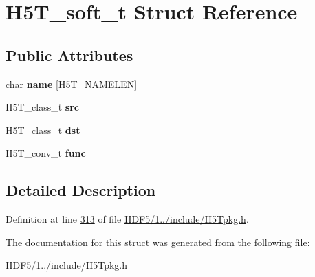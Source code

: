 \hypertarget{struct_h5_t__soft__t}{}\section{H5\+T\+\_\+soft\+\_\+t Struct Reference}
\label{struct_h5_t__soft__t}
\subsection*{Public Attributes}
\begin{DoxyCompactItemize}
\item 
\mbox{\label{struct_h5_t__soft__t_a04d301f43b7706a6f75dc665c483d376}} 
char {\bfseries name} \mbox{[}H5\+T\+\_\+\+N\+A\+M\+E\+L\+EN\mbox{]}
\item 
\mbox{\label{struct_h5_t__soft__t_ad2c9fa02f70cf54808845ea518972b4c}} 
H5\+T\+\_\+class\+\_\+t {\bfseries src}
\item 
\mbox{\label{struct_h5_t__soft__t_adf13401846e45afd1c84b6d4ad08f1eb}} 
H5\+T\+\_\+class\+\_\+t {\bfseries dst}
\item 
\mbox{\label{struct_h5_t__soft__t_ab4fa705c45f99c29d323325b18d27f30}} 
H5\+T\+\_\+conv\+\_\+t {\bfseries func}
\end{DoxyCompactItemize}


\subsection{Detailed Description}


Definition at line \hyperlink{_h_d_f5_21_810_81_2include_2_h5_tpkg_8h_source_l00313}{313} of file \hyperlink{_h_d_f5_21_810_81_2include_2_h5_tpkg_8h_source}{H\+D\+F5/1../include/\+H5\+Tpkg.\+h}.



The documentation for this struct was generated from the following file\+:\begin{DoxyCompactItemize}
\item 
H\+D\+F5/1../include/\+H5\+Tpkg.\+h\end{DoxyCompactItemize}
